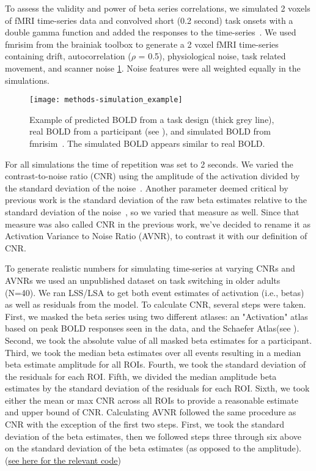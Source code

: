 \documentclass[10pt,letterpaper]{article}
\begin{document}
To assess the validity and power of beta series correlations,
we simulated 2 voxels of fMRI time-series data and convolved short (0.2 second)
task onsets with a double gamma function
and added the responses to the time-series~\cite{Glover1999,Welvaert2011}.
We used fmrisim from the brainiak toolbox\cite{Ellis2020} to generate a
2 voxel fMRI time-series containing drift, autocorrelation ($\rho$ = 0.5), physiological noise,
task related movement, and scanner noise \ref{fig:simulation_example}.
Noise features were all weighted equally in the simulations.

\begin{figure}[H]
  \centering
  \texttt{[image: methods-simulation\_example]}
  \caption{
    Example of predicted BOLD from a task design (thick grey line), real BOLD
    from a participant (see ), and simulated BOLD
    from fmrisim~\cite{Ellis2020}.
    The simulated BOLD appears similar to real BOLD.
  }
  \label{fig:simulation_example}
\end{figure}

For all simulations the time of repetition was set to 2 seconds.
We varied the contrast-to-noise ratio (CNR) using the amplitude of the activation
divided by the standard deviation of the noise~\cite{Welvaert2013a}.
Another parameter deemed critical by previous work is the standard deviation
of the raw beta estimates relative to the standard deviation of the noise~\cite{Abdulrahman2016},
so we varied that measure as well.
Since that measure was also called CNR in the previous work,
we've decided to rename it as Activation Variance to Noise Ratio (AVNR), to
contrast it with our definition of CNR.

To generate realistic numbers for simulating time-series at varying CNRs and AVNRs
we used an unpublished dataset on task switching in older adults (N=40).
We ran LSS/LSA to get both event estimates of activation (i.e., betas)
as well as residuals from the model.
To calculate CNR, several steps were taken.
First, we masked the beta series using two different atlases:
an "Activation" atlas based on peak BOLD responses seen in the data,
and the Schaefer Atlas\cite{Schaefer2017}(see ).
Second, we took the absolute value of all masked beta estimates for a participant.
Third, we took the median beta estimates over all events resulting
in a median beta estimate amplitude for all ROIs.
Fourth, we took the standard deviation of the residuals for each ROI.
Fifth, we divided the median amplitude beta estimates by the standard deviation of the residuals
for each ROI.
Sixth, we took either the mean or max CNR across all ROIs to provide a reasonable estimate
and upper bound of CNR.
Calculating AVNR followed the same procedure as CNR with the exception of the first two steps.
First, we took the standard deviation of the beta estimates, then we followed steps three through six above
on the standard deviation of the beta estimates (as opposed to the amplitude).
(\href{https://github.com/jdkent/BetaSeriesRealDataAnalysis/blob/90fafb5b83b2e1bfade61a9fb1a87f225efaa95f/nibsAnalysis/cnr_trial_variability.ipynb}{see here for the relevant code})
\end{document}
